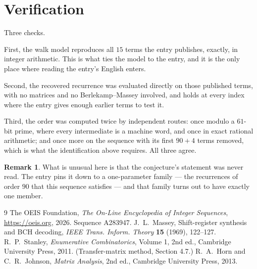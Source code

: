 \documentclass[11pt,a4paper]{article}
\theoremstyle{plain}
\theoremstyle{definition}
\newtheorem{remark}[theorem]{Remark}
\begin{document}
\section{Verification}

Three checks.

First, the walk model reproduces all $15$ terms the entry publishes, exactly, in integer
arithmetic. This is what ties the model to the entry, and it is the only place where reading
the entry's English enters.

Second, the recovered recurrence was evaluated directly on those published terms, with no
matrices and no Berlekamp--Massey involved, and holds at every index where the entry gives
enough earlier terms to test it.

Third, the order was computed twice by independent routes: once modulo a $61$-bit prime, where
every intermediate is a machine word, and once in exact rational arithmetic; and once more on
the sequence with its first $90+4$ terms removed, which is what the identification above
requires. All three agree.

\begin{remark}
What is unusual here is that the conjecture's statement was never read. The entry pins it down
to a one-parameter family --- the recurrences of order $90$ that this sequence satisfies
--- and that family turns out to have exactly one member.
\end{remark}

\begin{thebibliography}{9}
 The OEIS Foundation, \emph{The On-Line Encyclopedia of Integer
Sequences}, \url{https://oeis.org}, 2026. Sequence A283947.
 J.~L.~Massey, Shift-register synthesis and BCH decoding, \emph{IEEE
Trans. Inform. Theory} \textbf{15} (1969), 122--127.
 R.~P.~Stanley, \emph{Enumerative Combinatorics}, Volume 1, 2nd ed.,
Cambridge University Press, 2011. (Transfer-matrix method, Section 4.7.)
 R.~A.~Horn and C.~R.~Johnson, \emph{Matrix Analysis}, 2nd ed., Cambridge
University Press, 2013.
\end{thebibliography}
\end{document}
